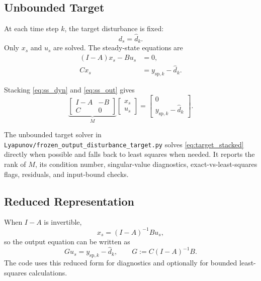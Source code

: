 \documentclass[11pt]{article}
\begin{document}
\subsection{Unbounded Target}

At each time step \(k\), the target disturbance is fixed:
\begin{equation}
d_s = \hat d_k.
\end{equation}
Only \(x_s\) and \(u_s\) are solved. The steady-state equations are
\begin{align}
(I-A)x_s - Bu_s &= 0, \label{eq:ss_dyn}\\
Cx_s &= y_{\mathrm{sp},k} - \hat d_k. \label{eq:ss_out}
\end{align}

Stacking \eqref{eq:ss_dyn} and \eqref{eq:ss_out} gives
\begin{equation}
\underbrace{
\begin{bmatrix}
I-A & -B \\
C & 0
\end{bmatrix}}_{M}
\begin{bmatrix}
x_s \\
u_s
\end{bmatrix}
=
\begin{bmatrix}
0 \\
y_{\mathrm{sp},k}-\hat d_k
\end{bmatrix}.
\label{eq:target_stacked}
\end{equation}

The unbounded target solver in
\texttt{Lyapunov/frozen\_output\_disturbance\_target.py} solves
\eqref{eq:target_stacked} directly when possible and falls back to least squares
when needed. It reports the rank of \(M\), its condition number, singular-value
diagnostics, exact-vs-least-squares flags, residuals, and input-bound checks.

\subsection{Reduced Representation}

When \(I-A\) is invertible,
\begin{equation}
x_s = (I-A)^{-1}Bu_s,
\end{equation}
so the output equation can be written as
\begin{equation}
G u_s = y_{\mathrm{sp},k}-\hat d_k,
\qquad
G := C(I-A)^{-1}B.
\label{eq:reduced_target}
\end{equation}
The code uses this reduced form for diagnostics and optionally for bounded
least-squares calculations.
\end{document}
